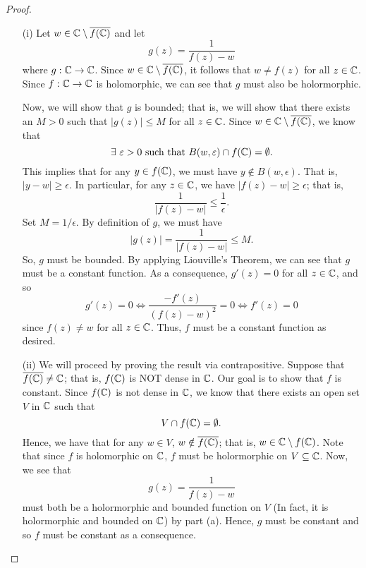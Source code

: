 \documentclass[a4paper]{article}
\begin{document}
\begin{proof}
\begin{enumerate}
    \item[(i)] Let \( w \in \mathbb{C} \setminus  \overline{f(\mathbb{C})} \) and let 
        \[  g(z) = \frac{ 1  }{  f(z) - w  }  \]
        where \( g: \mathbb{C} \to \mathbb{C}  \). Since \( w \in \mathbb{C} \setminus  \overline{f(\mathbb{C})} \), it follows that \( w \neq f(z) \) for all \( z \in \mathbb{C}  \). Since \( f: \mathbb{C} \to \mathbb{C}   \) is holomorphic, we can see that \( g  \) must also be holormorphic.

        Now, we will show that \( g  \) is bounded; that is, we will show that there exists an \( M > 0  \) such that \( | g(z) |  \leq M  \) for all \( z \in \mathbb{C}  \). Since \( w \in \mathbb{C} \setminus  \overline{f(\mathbb{C})} \), we know that 
        \[  \exists \ \epsilon > 0 \ \text{such that} \ B(w,\epsilon) \cap f(\C ) = \emptyset. \]
        This implies that for any \( y \in f(\mathbb{C}) \), we must have \( y \notin B(w,\epsilon)  \). That is, \( | y - w  |  \geq \epsilon \).
        In particular, for any \( z \in \mathbb{C}  \), we have \( | f(z) - w  |  \geq \epsilon \); that is,
        \[  \frac{ 1  }{  | f(z) - w  |  }  \leq \frac{ 1 }{ \epsilon  }.  \]
        Set \( M = 1 /\epsilon  \). By definition of \( g  \), we must have 
        \[  | g(z) |  = \frac{ 1 }{  | f(z) - w  |  } \leq M.  \]
        So, \( g  \) must be bounded. By applying Liouville's Theorem, we can see that \( g  \) must be a constant function. As a consequence, \( g'(z) = 0  \) for all \( z \in \mathbb{C}  \), and so
        \[  g'(z) = 0 \iff \frac{ - f'(z) }{ (f(z) - w)^{2} } = 0 \iff f'(z) = 0    \]
        since \( f(z) \neq w  \) for all \( z \in \mathbb{C} \). Thus, \( f  \) must be a constant function as desired.
    \item[(ii)] We will proceed by proving the result via contrapositive. Suppose that \( \overline{f(\mathbb{C}) } \neq \mathbb{C}  \); that is, \( f(\mathbb{C}) \) is NOT dense in \( \mathbb{C}  \). Our goal is to show that \( f  \) is constant. Since \( f(\mathbb{C}) \) is not dense in \( \mathbb{C}  \), we know that there exists an open set \( V  \) in \( \mathbb{C}  \) such that 
        \[  V \cap f(\mathbb{C}) = \emptyset. \]
        Hence, we have that for any \( w \in V \), \( w \notin \overline{f(\mathbb{C})}  \); that is, \( w \in \mathbb{C} \setminus  f(\mathbb{C}) \). Note that since \( f \) is holomorphic on \( \mathbb{C}  \), \( f  \) must be holormorphic on \( V \subseteq  \mathbb{C}  \). Now, we see that  
        \[  g(z) = \frac{ 1 }{ f(z) - w  }  \]
        must both be a holormorphic and bounded function on \( V \) (In fact, it is holormorphic and bounded on \( \mathbb{C}  \)) by part (a). Hence, \( g  \) must be constant and so \( f  \) must be constant as a consequence.
\end{enumerate} 
\end{proof}
\end{document}
